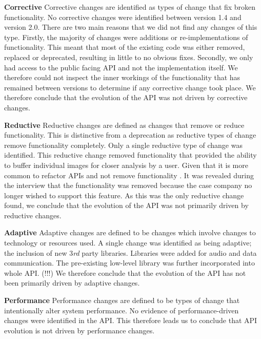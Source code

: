 \documentclass{sig-alternate}
\begin{document}
\smallskip \noindent
\textbf{Corrective  }
Corrective changes are identified as types of change that fix broken functionality.
No corrective changes were identified between version 1.4 and version 2.0. There are two main reasons that we did not find any changes of this type. Firstly, the majority of changes were additions or re-implementations of functionality. This meant that most of the existing code was either removed, replaced or deprecated, resulting in little to no obvious fixes. Secondly, we only had access to the public facing API and not the implementation itself. We therefore could not inspect the inner workings of the functionality that has remained between versions to determine if any corrective change took place.
We therefore conclude that the evolution of the API was not driven by corrective changes.

\smallskip \noindent
\textbf{Reductive  }
Reductive changes are defined as changes that remove or reduce functionality. This is distinctive from a deprecation as reductive types of change remove functionality completely.
Only a single reductive type of change was identified. This reductive change removed functionality that provided the ability to buffer individual images for closer analysis by a user. Given that it is more common to refactor APIs and not remove functionality \cite{dig2005role, xing2006refactoring}. It was revealed during the interview that the functionality was removed because the case company no longer wished to support this feature. 
As this was the only reductive change found, we conclude that the evolution of the API was not primarily driven by reductive changes.

\smallskip \noindent
\textbf{Adaptive  }
Adaptive changes are defined to be changes which involve changes to technology or resources used. 
A single change was identified as being adaptive; the inclusion of new 3\textit{rd} party libraries. Libraries were added for audio and data communication. The pre-existing low-level library was further incorporated into whole API. (!!!)
We therefore conclude that the evolution of the API has not been primarily driven by adaptive changes.

\smallskip \noindent
\textbf{Performance  }
Performance changes are defined to be types of change that intentionally alter system performance.
No evidence of performance-driven changes were identified in the API.
This therefore leads us to conclude that API evolution is not driven by performance changes.
\end{document}
